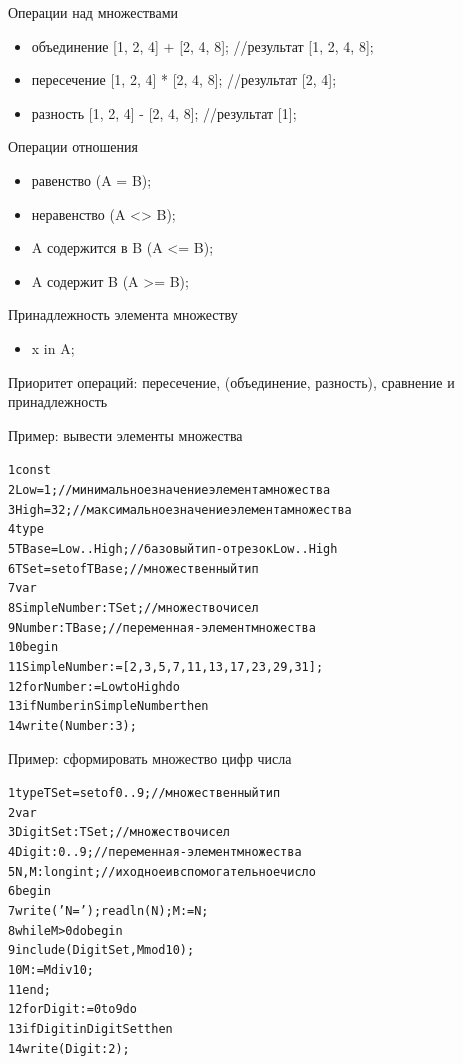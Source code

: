 \documentclass{beamer}
\begin{document}
\begin{frame}
\begin{block}{Операции над множествами}
\begin{itemize}
\item объединение [1, 2, 4] + [2, 4, 8]; //результат [1, 2, 4, 8];
\item пересечение [1, 2, 4] * [2, 4, 8]; //результат [2, 4];
\item разность [1, 2, 4] - [2, 4, 8]; //результат [1];
\end{itemize}
\end{block}
\begin{block}{Операции отношения}
\begin{itemize}
\item равенство (A = B);
\item неравенство (A <> B);
\item A содержится в B (A <= B);
\item A содержит B (A >= B);
\end{itemize}
\end{block}
\begin{block}{Принадлежность элемента множеству}
\begin{itemize}
\item x in A;
\end{itemize}
\end{block}
Приоритет операций: пересечение, (объединение, разность), сравнение и принадлежность
\end{frame}  

\begin{frame}[fragile]{Пример: вывести элементы множества}
\begin{alltt}
1  const
2    Low = 1;    //минимальное значение элемента множества
3    High = 32; //максимальное значение элемента множества
4  type 
5     TBase = Low..High; // базовый тип - отрезок Low..High    
6     TSet = set of TBase; //множественный тип
7  var
8     SimpleNumber: TSet; //множество чисел
9     Number: TBase; //переменная-элемент множества     
10 begin
11    SimpleNumber := [2, 3, 5, 7, 11, 13, 17, 23, 29, 31];
12    for Number := Low to High do
13      if Number in SimpleNumber then
14         write(Number:3);
\end{alltt}
\end{frame}   

\begin{frame}[fragile]{Пример: сформировать множество цифр числа}
\begin{alltt}
1  type TSet = set of 0..9; //множественный тип
2  var
3    DigitSet: TSet; //множество чисел
4    Digit: 0..9;   //переменная-элемент множества     
5    N, M: longint;  //иходное и вспомогательное число
6  begin
7    write('N = '); readln(N); M := N;
8    while M > 0 do begin
9      include(DigitSet, M mod 10);
10      M := M div 10;
11   end;  
12    for Digit := 0 to 9 do
13      if Digit in DigitSet then
14         write(Digit:2);
\end{alltt}
\end{frame}  
\end{document}
